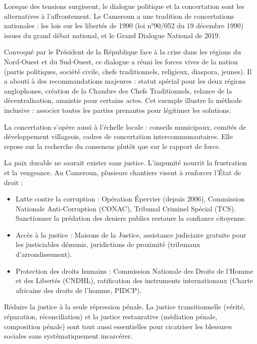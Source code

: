 \documentclass[11pt]{article}
\newcommand{\cle}[1]{{\popxbold\color{popdark}#1}}
\newcounter{popsec}
\newcounter{popsub}
\newcommand{\courssub}[1]{%
  \stepcounter{popsub}%
  \par\vspace{9pt}\noindent{\popxbold\fontsize{11.5}{13}\selectfont\color{popink}{\color{poporange}\thepopsec.\thepopsub}\hspace{6pt}#1}\par\nopagebreak\vspace{4pt}
}
\begin{document}
Lorsque des tensions surgissent, le \cle{dialogue politique} et la \cle{concertation} sont les alternatives à l'affrontement. Le Cameroun a une tradition de concertations nationales : les lois sur les libertés de 1990 (loi n°90/052 du 19 décembre 1990) issues du grand débat national, et le \cle{Grand Dialogue National} de 2019.

\begin{exemplebox}
Convoqué par le Président de la République face à la crise dans les régions du Nord-Ouest et du Sud-Ouest, ce dialogue a réuni les \cle{forces vives de la nation} (partis politiques, société civile, chefs traditionnels, religieux, diaspora, jeunes). Il a abouti à des recommandations majeures : statut spécial pour les deux régions anglophones, création de la Chambre des Chefs Traditionnels, relance de la décentralisation, amnistie pour certains actes. Cet exemple illustre la méthode \cle{inclusive} : associer toutes les parties prenantes pour légitimer les solutions.
\end{exemplebox}

La concertation s'opère aussi à l'échelle locale : conseils municipaux, comités de développement villageois, cadres de concertation intercommunautaires. Elle repose sur la \cle{recherche du consensus} plutôt que sur le rapport de force.

\courssub{La justice et l'équité}

La paix durable ne saurait exister sans \cle{justice}. L'impunité nourrit la frustration et la vengeance. Au Cameroun, plusieurs chantiers visent à renforcer l'État de droit :
\begin{itemize}
    \item \cle{Lutte contre la corruption} : Opération \cle{Épervier} (depuis 2006), Commission Nationale Anti-Corruption (CONAC), Tribunal Criminel Spécial (TCS). Sanctionner la prédation des deniers publics restaure la confiance citoyenne.
    \item \cle{Accès à la justice} : Maisons de la Justice, assistance judiciaire gratuite pour les justiciables démunis, juridictions de proximité (tribunaux d'arrondissement).
    \item \cle{Protection des droits humains} : Commission Nationale des Droits de l'Homme et des Libertés (CNDHL), ratification des instruments internationaux (Charte africaine des droits de l'homme, PIDCP).
\end{itemize}

\begin{attention}
Réduire la justice à la seule répression pénale. La \cle{justice transitionnelle} (vérité, réparation, réconciliation) et la \cle{justice restaurative} (médiation pénale, composition pénale) sont tout aussi essentielles pour cicatriser les blessures sociales sans systématiquement incarcérer.
\end{attention}
\end{document}
